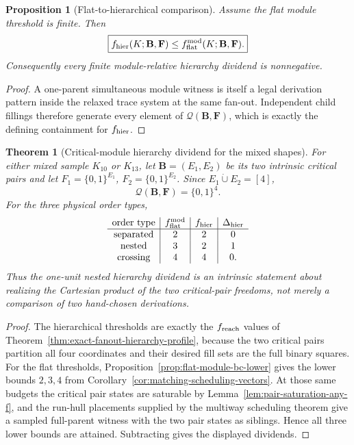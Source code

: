 \documentclass[11pt]{article}
\newtheorem{proposition}[definition]{Proposition}
\newtheorem{theorem}[definition]{Theorem}
\begin{document}
\begin{proposition}[Flat-to-hierarchical comparison]
\label{prop:flat-dominates-hier}
Assume the flat module threshold is finite.  Then
\[
 \boxed{
 f_{\rm hier}(K;\mathbf B,\mathbf F)
 \le
 f_{\rm flat}^{\rm mod}(K;\mathbf B,\mathbf F).
 }
\]
Consequently every finite module-relative hierarchy dividend is nonnegative.
\end{proposition}

\begin{proof}
A one-parent simultaneous module witness is itself a legal derivation pattern
inside the relaxed trace system at the same fan-out.  Independent child
fillings therefore generate every element of
$\mathcal Q(\mathbf B,\mathbf F)$, which is exactly the defining containment
for $f_{\rm hier}$.
\end{proof}

\begin{theorem}[Critical-module hierarchy dividend for the mixed shapes]
\label{thm:critical-module-dividend}
For either mixed sample $K_{10}$ or $K_{13}$, let
$\mathbf B=(E_1,E_2)$ be its two intrinsic critical pairs and let
$F_1=\{0,1\}^{E_1}$, $F_2=\{0,1\}^{E_2}$.  Since $E_1\dot\cup E_2=[4]$,
\[
  \mathcal Q(\mathbf B,\mathbf F)=\{0,1\}^4.
\]
For the three physical order types,
\[
\begin{array}{c|c|c|c}
\text{order type}
&f_{\rm flat}^{\rm mod}
&f_{\rm hier}
&\Delta_{\rm hier}\\
\hline
\text{separated}&2&2&0\\
\text{nested}&3&2&1\\
\text{crossing}&4&4&0.
\end{array}
\]
Thus the one-unit nested hierarchy dividend is an intrinsic statement about
realizing the Cartesian product of the two critical-pair freedoms, not merely
a comparison of two hand-chosen derivations.
\end{theorem}

\begin{proof}
The hierarchical thresholds are exactly the $f_{\rm reach}$ values of
Theorem~\ref{thm:exact-fanout-hierarchy-profile}, because the two critical
pairs partition all four coordinates and their desired fill sets are the full
binary squares.  For the flat thresholds, Proposition~\ref{prop:flat-module-bc-lower}
gives the lower bounds $2,3,4$ from
Corollary~\ref{cor:matching-scheduling-vectors}.  At those same budgets the
critical pair states are saturable by Lemma~\ref{lem:pair-saturation-any-f},
and the run-hull placements supplied by the multiway scheduling theorem give a
sampled full-parent witness with the two pair states as siblings.  Hence all
three lower bounds are attained.  Subtracting gives the displayed dividends.
\end{proof}
\end{document}
